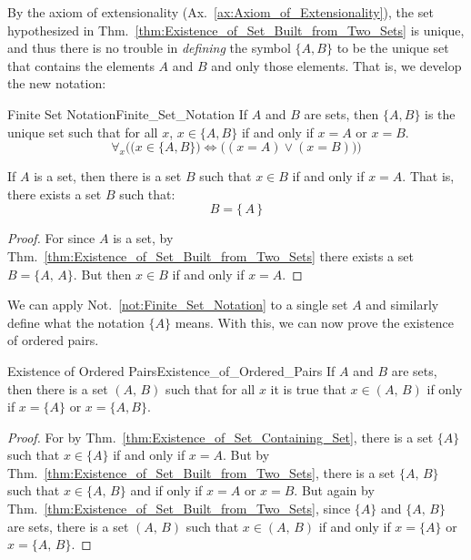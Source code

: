         By the axiom of extensionality
        (Ax.~\ref{ax:Axiom_of_Extensionality}), the set hypothesized in
        Thm.~\ref{thm:Existence_of_Set_Built_from_Two_Sets} is unique, and thus
        there is no trouble in \textit{defining} the symbol $\{A,B\}$ to be the
        unique set that contains the elements $A$ and $B$ and only those
        elements. That is, we develop the new notation:
        \begin{fnotation}{Finite Set Notation}{Finite_Set_Notation}
            If $A$ and $B$ are sets, then $\{A,B\}$ is the unique set such that
            for all $x$, $x\in\{A,B\}$ if and only if $x=A$ or $x=B$.
            \begin{equation*}
                \forall_{x}\Big(\big(x\in\{A,B\}\big)
                \Longleftrightarrow\big((x=A)\lor(x=B)\big)\Big)
            \end{equation*}
        \end{fnotation}
        \begin{theorem}
            \label{thm:Existence_of_Set_Containing_Set}%
            If $A$ is a set, then there is a set $B$ such that $x\in{B}$ if
            and only if $x=A$. That is, there exists a set $B$ such that:
            \begin{equation}
                B=\{\,A\,\}
            \end{equation}
        \end{theorem}
        \begin{proof}
            For since $A$ is a set, by
            Thm.~\ref{thm:Existence_of_Set_Built_from_Two_Sets} there exists
            a set $B=\{A,\,A\}$. But then $x\in{B}$ if and only if $x=A$.
        \end{proof}
        We can apply Not.~\ref{not:Finite_Set_Notation} to a single set $A$ and
        similarly define what the notation $\{A\}$ means. With this, we can now
        prove the existence of ordered pairs.
        \begin{ltheorem}{Existence of Ordered Pairs}{Existence_of_Ordered_Pairs}
            If $A$ and $B$ are sets, then there is a set $(A,\,B)$ such that
            for all $x$ it is true that $x\in(A,\,B)$ if only if $x=\{A\}$
            or $x=\{A,B\}$.
        \end{ltheorem}
        \begin{proof}
            For by Thm.~\ref{thm:Existence_of_Set_Containing_Set}, there is
            a set $\{A\}$ such that $x\in\{A\}$ if and only if $x=A$.
            But by Thm.~\ref{thm:Existence_of_Set_Built_from_Two_Sets}, there
            is a set $\{A,\,B\}$ such that $x\in\{A,\,B\}$ and if only
            if $x=A$ or $x=B$. But again by
            Thm.~\ref{thm:Existence_of_Set_Built_from_Two_Sets}, since
            $\{A\}$ and $\{A,\,B\}$ are sets, there is a set $(A,\,B)$ such
            that $x\in(A,\,B)$ if and only if $x=\{A\}$ or $x=\{A,\,B\}$.
        \end{proof}
